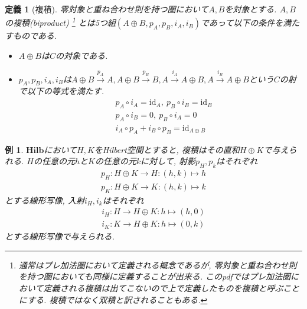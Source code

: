 \documentclass[a4paper,12pt]{ltjsarticle}
\theoremstyle{break}
\newtheorem{defn}[thm]{定義}
\newtheorem{eg}[thm]{例}
\newcommand{\hilb}{\mathbf{Hilb}}
\newcommand{\xr}[1]{\xrightarrow{#1}}
\newcommand{\id}{\mathrm{id}}
\newcommand{\ci}{\circ}
\newcommand{\mt}{\mapsto}
\newcommand{\opl}{\oplus}
\numberwithin{equation}{section}
\begin{document}
\begin{defn}[複積]
  零対象と重ね合わせ則を持つ圏において$A,B$を対象とする. 
  $A,B$の複積(biproduct)
  \footnote{
    通常はプレ加法圏において定義される概念であるが, 零対象と重ね合わせ則を持つ圏においても同様に定義することが出来る.
    このpdfではプレ加法圏において定義される複積は出てこないので上で定義したものを複積と呼ぶことにする.  
    複積ではなく双積と訳されることもある. 
  }
  とは5つ組$(A \opl B, p_A,p_B,i_A,i_B)$であって以下の条件を満たすものである. 
  \begin{itemize}
    \item $A \opl B$は$C$の対象である. 
    \item $p_A,p_B,i_A,i_B$は$A \opl B \xr{p_A} A, A \opl B \xr{p_B} B, A \xr{i_A} A \opl B, A \xr{i_B} A \opl B$という$C$の射で以下の等式を満たす. 
    \begin{align*}
      &p_A \ci i_A = \id_A, ~ p_B \ci i_B = \id_B \\
      &p_A \ci i_B = 0, ~ p_B \ci i_A = 0 \\
      &i_A \ci p_A + i_B \ci p_B = \id_{A \opl B} 
    \end{align*}
  \end{itemize}
\end{defn}

\begin{eg}
  $\hilb$において$H,K$をHilbert空間とすると, 複積はその直和$H \opl K$で与えられる. 
  $H$の任意の元$h$と$K$の任意の元$k$に対して, 
  射影$p_H, p_k$はそれぞれ
  \begin{align*}
    p_H: H \opl K \to H: (h,k) \mapsto h \\
    p_K: H \opl K \to K: (h,k) \mapsto k
  \end{align*}
  とする線形写像, 入射$i_H, i_k$はそれぞれ
  \begin{align*}
    i_H: H \to H \opl K: h \mt (h,0) \\
    i_K: K \to H \opl K: h \mt (0,k)
  \end{align*} 
  とする線形写像で与えられる. 
\end{eg}
\end{document}
